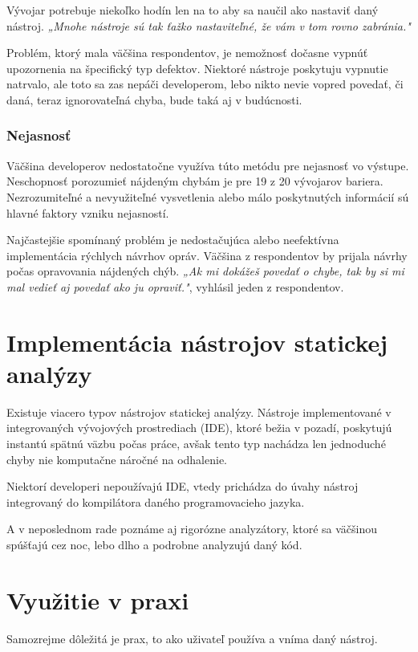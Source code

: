 \documentclass[10pt,twoside,slovak,a4paper]{article}
\begin{document}
Vývojar potrebuje niekoľko hodín len na to aby sa naučil ako nastaviť daný nástroj. \emph{„Mnohe nástroje sú tak ťažko nastaviteľné, že vám v tom rovno zabránia."}

Problém, ktorý mala väčšina respondentov, je nemožnosť dočasne vypnúť upozornenia na špecifický typ defektov. Niektoré
nástroje poskytuju vypnutie natrvalo, ale toto sa zas nepáči developerom, lebo nikto nevie vopred povedať, či daná,
teraz ignorovateľná chyba, bude taká aj v budúcnosti.

\subsubsection*{Nejasnosť}
Väčšina developerov nedostatočne využíva túto metódu pre nejasnosť vo výstupe. Neschopnosť porozumieť nájdeným chybám
je pre 19 z 20 vývojarov bariera. Nezrozumiteľné a nevyužiteľné vysvetlenia alebo málo poskytnutých informácií sú hlavné
faktory vzniku nejasností.

Najčastejšie spomínaný problém je nedostačujúca alebo neefektívna implementácia rýchlych návrhov opráv. Väčšina z
respondentov by prijala návrhy počas opravovania nájdených chýb. \emph{„Ak mi dokážeš povedať o chybe, tak by si mi mal
	vedieť aj povedať ako ju opraviť."}, vyhlásil jeden z respondentov.

\section{Implementácia nástrojov statickej analýzy} \label{implementacia}
Existuje viacero typov nástrojov statickej analýzy. Nástroje implementované v integrovaných vývojových prostrediach (IDE),
ktoré bežia v pozadí, poskytujú instantú spätnú väzbu počas práce, avšak tento typ nachádza len jednoduché chyby nie
komputačne náročné na odhalenie.

Niektorí developeri nepoužívajú IDE, vtedy prichádza do úvahy nástroj integrovaný do
kompilátora daného programovacieho jazyka.

A v neposlednom rade poznáme aj rigorózne analyzátory, ktoré sa väčšinou
spúšťajú cez noc, lebo dlho a podrobne analyzujú daný kód.\cite{BrittanyJohnson, LisaNguyen}

\section{Využitie v praxi} \label{dev}
Samozrejme dôležitá je prax, to ako uživateľ používa a vníma daný nástroj\cite{LisaNguyen}.
\end{document}
